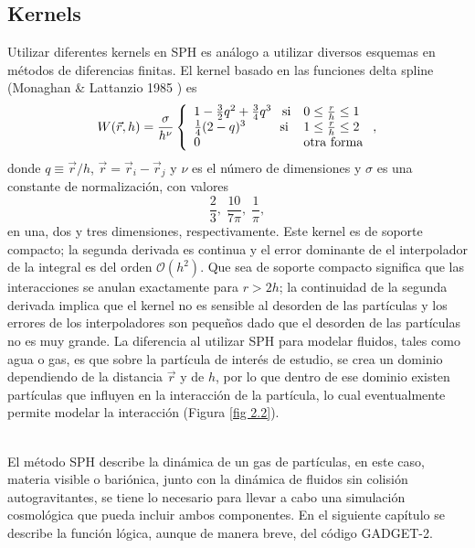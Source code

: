\documentclass[a4paper,openright,12pt]{book}
\begin{document}
\subsection{Kernels}
Utilizar diferentes kernels en SPH es análogo a utilizar diversos esquemas en métodos de diferencias finitas. El kernel basado en las funciones delta spline (Monaghan \& Lattanzio  1985 \cite{b8.1}) es
\begin{equation}
W(\vec{r},h) = \frac{\sigma}{h^{\nu}} \left\lbrace
\begin{array}{ll}
1- \frac{3}{2}q^{2} +\frac{3}{4}q^{3} \;\;\;\textup{si} & 0 \leq \frac{r}{h} \leq 1\\

\frac{1}{4}(2-q)^{3} \;\;\;\;\;\;\,\,\,\,\,\, \textup{si} & 1 \leq \frac{r}{h} \leq 2\\
0 & \textup{otra forma}
\end{array}
\right.,\label{eqn 2.43}
\end{equation}
donde $ q\equiv \vec{r}/h$, $\vec{r}=\vec{r}_{i} - \vec{r}_{j}$ y $\nu$ es el número de dimensiones y $\sigma$ es una constante de normalización, con valores
\begin{equation*}
\frac{2}{3}, \; \frac{10}{7\pi}, \; \frac{1}{\pi},
\end{equation*}
en una, dos y tres dimensiones, respectivamente. Este kernel es de soporte compacto; la segunda derivada es continua y el error dominante de el interpolador de la integral es del orden $\mathcal{O}(h^{2})$. Que sea de soporte compacto significa que las interacciones se anulan exactamente para $r>2h$; la continuidad de la segunda derivada implica que el kernel no es sensible al desorden de las partículas y los errores de los interpoladores son pequeños dado que el desorden de las partículas no es muy grande. La diferencia al utilizar SPH para modelar fluidos, tales como agua o gas, es que sobre la partícula de interés de estudio, se crea un dominio dependiendo de la distancia $\vec{r}$ y de $h$, por lo que dentro de ese dominio existen partículas que influyen en la interacción de la partícula, lo cual eventualmente permite modelar la interacción (Figura \ref{fig 2.2}).\\\


El método SPH describe la dinámica de un gas de partículas, en este caso, materia visible o bariónica, junto con la dinámica de fluidos sin colisión autogravitantes, se tiene lo necesario para llevar a cabo una simulación cosmológica que pueda incluir ambos componentes. En el siguiente capítulo se describe la función lógica, aunque de manera breve, del código GADGET-2.
\end{document}
